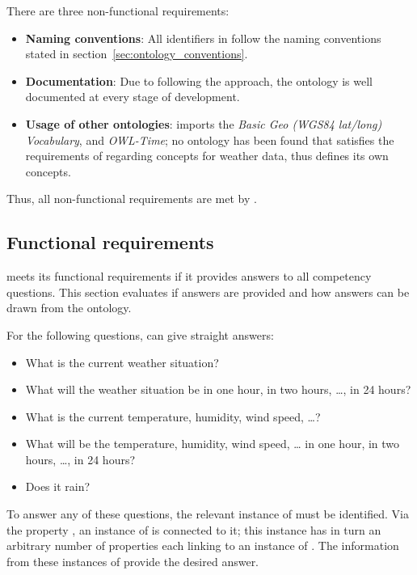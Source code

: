 There are three non-functional requirements:

\begin{itemize}
  \item \textbf{Naming conventions}: All identifiers in \smarthomeweather follow the naming conventions stated in section~\ref{sec:ontology_conventions}.
  \item \textbf{Documentation}: Due to following the \methontology approach, the ontology is well documented at every stage of development.
  \item \textbf{Usage of other ontologies}: \smarthomeweather imports the \emph{Basic Geo (WGS84 lat/long) Vocabulary}, \muo and \emph{OWL-Time}; no ontology has been found that satisfies the requirements of \smarthomeweather regarding concepts for weather data, thus \smarthomeweather defines its own concepts.
\end{itemize}

Thus, all non-functional requirements are met by \smarthomeweather.

\subsection{Functional requirements}
\label{sec:evaluation_functional}

\smarthomeweather meets its functional requirements if it provides answers to all competency questions. This section evaluates if answers are provided and how answers can be drawn from the ontology.

For the following questions, \smarthomeweather can give straight answers:
\begin{itemize}
  \item What is the current weather situation?
  \item What will the weather situation be in one hour, in two hours, …, in 24 hours?
  \item What is the current temperature, humidity, wind speed, …?
  \item What will be the temperature, humidity, wind speed, … in one hour, in two hours, …, in 24 hours?
  \item Does it rain?
\end{itemize}
To answer any of these questions, the relevant instance of  must be identified. Via the property , an instance of  is connected to it; this instance has in turn an arbitrary number of  properties each linking to an instance of . The information from these instances of  provide the desired answer.

